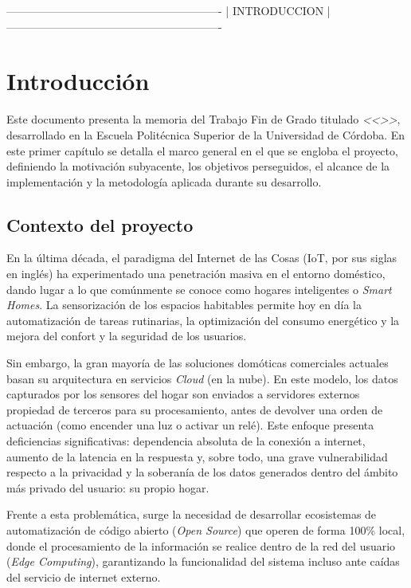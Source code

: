 ----------------------------------------------------------
|                     INTRODUCCION                       |
----------------------------------------------------------

\newpage
\section{Introducción}
\label{sec:introduccion}

Este documento presenta la memoria del Trabajo Fin de Grado titulado \textit{<<\TituloTFG>>}, desarrollado en la Escuela Politécnica Superior de la Universidad de Córdoba. En este primer capítulo se detalla el marco general en el que se engloba el proyecto, definiendo la motivación subyacente, los objetivos perseguidos, el alcance de la implementación y la metodología aplicada durante su desarrollo.

\subsection{Contexto del proyecto}
En la última década, el paradigma del Internet de las Cosas (IoT, por sus siglas en inglés) ha experimentado una penetración masiva en el entorno doméstico, dando lugar a lo que comúnmente se conoce como hogares inteligentes o \textit{Smart Homes}. La sensorización de los espacios habitables permite hoy en día la automatización de tareas rutinarias, la optimización del consumo energético y la mejora del confort y la seguridad de los usuarios.

Sin embargo, la gran mayoría de las soluciones domóticas comerciales actuales basan su arquitectura en servicios \textit{Cloud} (en la nube). En este modelo, los datos capturados por los sensores del hogar son enviados a servidores externos propiedad de terceros para su procesamiento, antes de devolver una orden de actuación (como encender una luz o activar un relé). Este enfoque presenta deficiencias significativas: dependencia absoluta de la conexión a internet, aumento de la latencia en la respuesta y, sobre todo, una grave vulnerabilidad respecto a la privacidad y la soberanía de los datos generados dentro del ámbito más privado del usuario: su propio hogar.

Frente a esta problemática, surge la necesidad de desarrollar ecosistemas de automatización de código abierto (\textit{Open Source}) que operen de forma 100\% local, donde el procesamiento de la información se realice dentro de la red del usuario (\textit{Edge Computing}), garantizando la funcionalidad del sistema incluso ante caídas del servicio de internet externo.

